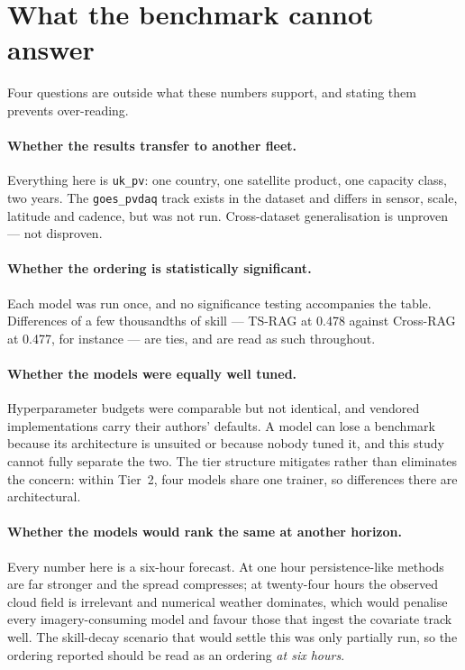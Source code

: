 \section{What the benchmark cannot answer}
\label{sec:benchmark-limits}

Four questions are outside what these numbers support, and stating them prevents
over-reading.

\paragraph{Whether the results transfer to another fleet.} Everything here is
\texttt{uk\_pv}: one country, one satellite product, one capacity class, two years. The
\texttt{goes\_pvdaq} track exists in the dataset and differs in sensor, scale, latitude and
cadence, but was not run. Cross-dataset generalisation is unproven --- not disproven.

\paragraph{Whether the ordering is statistically significant.} Each model was run once, and
no significance testing accompanies the table. Differences of a few thousandths of skill ---
TS-RAG at 0.478 against Cross-RAG at 0.477, for instance --- are ties, and are read as such
throughout.

\paragraph{Whether the models were equally well tuned.} Hyperparameter budgets were
comparable but not identical, and vendored implementations carry their authors' defaults.
A model can lose a benchmark because its architecture is unsuited or because nobody tuned it,
and this study cannot fully separate the two. The tier structure mitigates rather than
eliminates the concern: within Tier~2, four models share one trainer, so differences there are
architectural.

\paragraph{Whether the models would rank the same at another horizon.} Every number here is a
six-hour forecast. At one hour persistence-like methods are far stronger and the spread
compresses; at twenty-four hours the observed cloud field is irrelevant and numerical weather
dominates, which would penalise every imagery-consuming model and favour those that ingest
the covariate track well. The skill-decay scenario that would settle this was only partially
run, so the ordering reported should be read as an ordering \emph{at six hours}.

